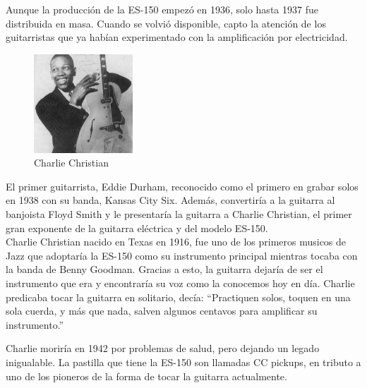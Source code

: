 \documentclass{article}
\begin{document}
Aunque la producción de la ES-150 empezó en 1936, solo hasta 1937 fue distribuida en masa. Cuando se volvió disponible, capto la atención de los guitarristas que ya habían experimentado con la amplificación por electricidad.\\

\begingroup
\setlength{\intextsep}{0pt}%
\setlength{\columnsep}{0pt}%

\begin{figure}
    \centering
    \includegraphics[width=0.33\textwidth]{images/cc.jpg}
    \vspace{-5pt}
    \caption{Charlie Christian}
\end{figure}

El primer guitarrista, Eddie Durham, reconocido como el primero en grabar solos en 1938 con su banda, Kansas City Six. Además, convertiría a la guitarra al banjoista Floyd Smith y le presentaría la guitarra a Charlie Christian, el primer gran exponente de la guitarra eléctrica y del modelo ES-150.\\

Charlie Christian nacido en Texas en 1916, fue uno de los primeros musicos de Jazz que adoptaría la ES-150 como su instrumento principal mientras tocaba con la banda de Benny Goodman. Gracias a esto, la guitarra dejaría de ser el instrumento que era y encontraría su voz como la conocemos hoy en día. Charlie predicaba tocar la guitarra en solitario, decía: “Practiquen solos, toquen en una sola cuerda, y más que nada, salven algunos centavos para amplificar su instrumento.”\\

\endgroup

Charlie moriría en 1942 por problemas de salud, pero dejando un legado inigualable. La pastilla que tiene la ES-150 son llamadas CC pickups, en tributo a uno de los pioneros de la forma de tocar la guitarra actualmente.\\

\begingroup
\setlength{\intextsep}{0pt}%
\setlength{\columnsep}{0pt}%
\end{document}
